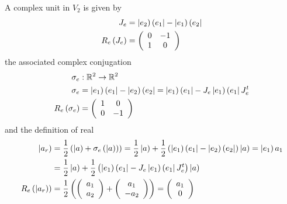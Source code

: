 \documentclass[aps,preprint]{revtex4}%
\begin{document}
A complex unit in $V_{2}$ is given by
\begin{align}
J_{e}  &  =\left\vert e_{2}\right)  \left(  e_{1}\right\vert -\left\vert
e_{1}\right)  \left(  e_{2}\right\vert \\
R_{e}\left(  J_{e}\right)   &  =\left(
\begin{array}
[c]{cc}%
0 & -1\\
1 & 0
\end{array}
\right)
\end{align}
the associated complex conjugation
\begin{align}
\sigma_{e}  &  :\mathbb{R}^{2}\rightarrow\mathbb{R}^{2}\\
\sigma_{e}  &  =\left\vert e_{1}\right)  \left(  e_{1}\right\vert -\left\vert
e_{2}\right)  \left(  e_{2}\right\vert =\left\vert e_{1}\right)  \left(
e_{1}\right\vert -J_{e}\left\vert e_{1}\right)  \left(  e_{1}\right\vert
J_{e}^{t}\\
R_{e}\left(  \sigma_{e}\right)   &  =\left(
\begin{array}
[c]{cc}%
1 & 0\\
0 & -1
\end{array}
\right)
\end{align}
and the definition of real
\begin{align}
\left\vert a_{r}\right)   &  =\frac{1}{2}\left(  \left\vert a\right)
+\sigma_{e}\left(  \left\vert a\right)  \right)  \right)  =\frac{1}%
{2}\left\vert a\right)  +\frac{1}{2}\left(  \left\vert e_{1}\right)  \left(
e_{1}\right\vert -\left\vert e_{2}\right)  \left(  e_{2}\right\vert \right)
\left\vert a\right)  =\left\vert e_{1}\right)  a_{1}\\
&  =\frac{1}{2}\left\vert a\right)  +\frac{1}{2}\left(  \left\vert
e_{1}\right)  \left(  e_{1}\right\vert -J_{e}\left\vert e_{1}\right)  \left(
e_{1}\right\vert J_{e}^{t}\right)  \left\vert a\right) \\
R_{e}\left(  \left\vert a_{r}\right)  \right)   &  =\frac{1}{2}\left(  \left(
%
\begin{array}
[c]{c}%
a_{1}\\
a_{2}%
\end{array}
\right)  +\left(
\begin{array}
[c]{c}%
a_{1}\\
-a_{2}%
\end{array}
\right)  \right)  =\left(
\begin{array}
[c]{c}%
a_{1}\\
0
\end{array}
\right)
\end{align}
\end{document}
